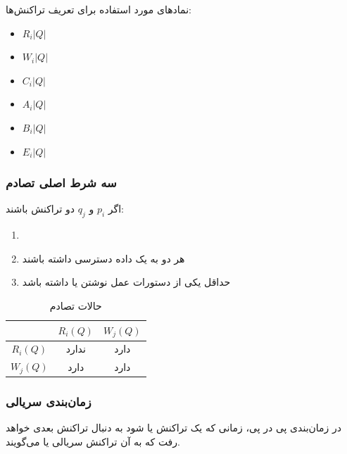 نماد‌های مورد استفاده برای تعریف تراکنش‌ها:

\begin{itemize}
    \item $R_{i}| Q |$
    \item $W_{i}| Q |$
    \item $C_{i}| Q |$
    \item $A_{i}| Q |$
    \item $B_{i}| Q |$
    \item $E_{i}| Q |$
\end{itemize}

\subsubsection{سه شرط اصلی تصادم}

اگر $p_{i}$ و $q_{j}$ دو تراکنش باشند:

\begin{enumerate}
    \item {}
    \item هر دو به یک داده دسترسی داشته باشند
    \item حداقل یکی از دستورات عمل نوشتن یا  داشته باشد
\end{enumerate}


\begin{LTR}
    \begin{table}[h]
        \centering
        \begin{RTL}
            \caption{حالات تصادم}
        \end{RTL}
        \begin{tabular}{|c|c|c|}
            \hline
            & $R_{i}(Q)$ & $W_{j}(Q)$ \\ \hline
            $R_{i}(Q)$ & ندارد &  دارد  \\ \hline
            $W_{j}(Q)$ & دارد & دارد  \\ \hline
        \end{tabular}
    \end{table}
\end{LTR}

\subsubsection{زمان‌بندی سریالی}

در زمان‌بندی پی در پی، زمانی که یک تراکنش  یا  شود به دنبال
تراکنش بعدی خواهد رفت که به آن تراکنش سریالی یا 
می‌گویند.

